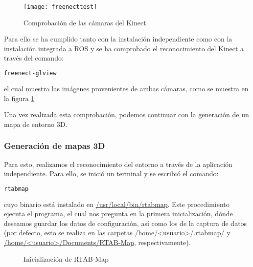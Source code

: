 \begin{figure}[b]
\centering
\texttt{[image: freenecttest]}
\caption{Comprobación de las cámaras del Kinect}
\label{figure:freenecttest}
\end{figure}

Para ello se ha cumplido tanto con la instalación independiente como con la instalación integrada a ROS y se ha comprobado el reconocimiento del Kinect a través del comando:

\begin{blackcodebox}
\begin{lstlisting}[language=bash]
freenect-glview
\end{lstlisting}
\end{blackcodebox}

\noindent el cual muestra las imágenes provenientes de ambas cámaras, como se muestra en la figura \ref{figure:freenecttest}

Una vez realizada esta comprobación, podemos continuar con la generación de un mapa de entorno 3D.

\subsubsection{Generación de mapas 3D}

Para esto, realizamos el reconocimiento del entorno a través de la aplicación independiente. Para ello, se inició un terminal y se escribió el comando:

\begin{blackcodebox}
\begin{lstlisting}[language=bash]
rtabmap
\end{lstlisting}
\end{blackcodebox}

\noindent cuyo binario está instalado en \url{/usr/local/bin/rtabmap}. Este procedimiento ejecuta el programa, el cual nos pregunta en la primera inicialización, dónde deseamos guardar los datos de configuración, así como los de la captura de datos (por defecto, esto se realiza en las carpetas \url{/home/<usuario>/.rtabmap/} y \url{/home/<usuario>/Documents/RTAB-Map}, respectivamente).

\begin{figure}[hb]
\centering
{}\hspace{1em}%
\caption{Inicialización de RTAB-Map}
\label{figure:rtabmapinit}
\end{figure}

